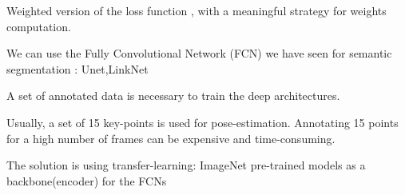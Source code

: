 \documentclass{article}
\begin{document}
Weighted version of the loss function , with a meaningful strategy for weights computation.

We can use the Fully Convolutional Network (FCN) we have seen for semantic segmentation : Unet,LinkNet

A set of annotated data is necessary to train the deep architectures.

Usually, a set of 15 key-points is used for pose-estimation. Annotating 15 points for a high number of frames can be expensive and time-consuming.

The solution is using transfer-learning: ImageNet pre-trained models as a backbone(encoder) for the FCNs
\end{document}
